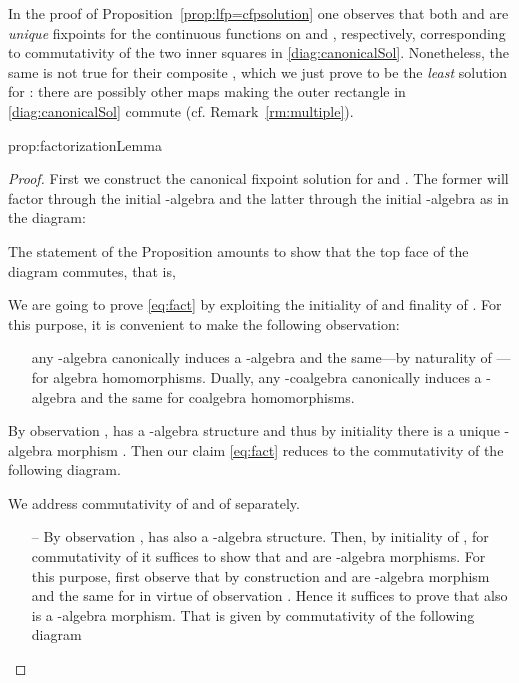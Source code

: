 \documentclass[oribibl,envcountsame,envcountsect,runningheads]{llncs}
\renewcommand{\>}{\rangle}
\newenvironment{proposition_for}[2][\empty]{\bigskip\noindent{\bf
    Proposition~\ref{#2}}\ifthenelse{\equal{#1}{\empty}}{{\bf.}}{ {\bf
      (#1).}}\it}{\vspace{0.5cm}}
\begin{document}
\begin{remark}\label{rm:uniqueness} In the proof of Proposition~\ref{prop:lfp=cfpsolution} one observes that both  and  are \emph{unique} fixpoints for the continuous functions on  and , respectively, corresponding to commutativity of the two inner squares in \eqref{diag:canonicalSol}. Nonetheless, the same is not true for their composite , which we just prove to be the \emph{least} solution for : there are possibly other maps making the outer rectangle in \eqref{diag:canonicalSol} commute (cf. Remark~\ref{rm:multiple}).
\end{remark}

 \begin{proposition_for}{prop:factorizationLemma}
 \propfact
 \end{proposition_for}
\begin{proof} First we construct the canonical fixpoint solution for  and . The former will factor through the initial -algebra  and the latter through the initial -algebra  as in the diagram:

The statement of the Proposition amounts to show that the top face of the diagram commutes, that is,

We are going to prove \eqref{eq:fact} by exploiting the initiality of  and finality of . For this purpose, it is convenient to make the following observation:
\begin{itemize}
  \item[] any -algebra  canonically induces a -algebra   and the same---by naturality of ---for algebra homomorphisms. Dually, any -coalgebra  canonically induces a -algebra  and the same for coalgebra homomorphisms.
      
\end{itemize}
By observation ,  has a -algebra structure and thus by initiality there is a unique -algebra morphism . Then our claim \eqref{eq:fact} reduces to the commutativity of the following diagram.
      
We address commutativity of  and of  separately.
\begin{itemize}
  \item[--] By observation ,  has also a -algebra structure. Then, by initiality of , for commutativity of  it suffices to show that  and  are -algebra morphisms. For this purpose, first observe that by construction  and  are -algebra morphism and the same for  in virtue of observation . Hence it suffices to prove that also  is a -algebra morphism. That is given by commutativity of the following diagram
        

\end{itemize}
\end{proof}
\end{document}

